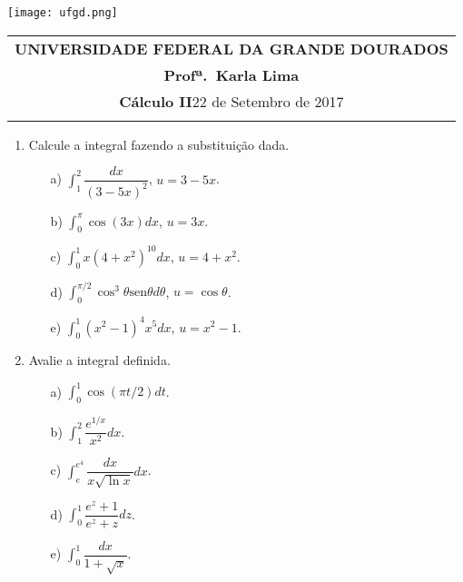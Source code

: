 \documentclass[a4paper,5pt]{amsbook}
\newcommand{\sen}{\text{sen}}
\begin{document}
\thispagestyle{empty}
\hspace{-0.6cm}
\begin{minipage}[p]{0.14\linewidth}
	\texttt{[image: ufgd.png]}
\end{minipage}
\begin{minipage}[p]{0.7\linewidth}
\begin{tabular}{c}
\toprule{}
{{\bf UNIVERSIDADE FEDERAL DA GRANDE DOURADOS}}\\
{{\bf Profª.\ Karla Lima}}\\
\midrule{}
{{\bf Cálculo II}}\hspace{4cm}22 de Setembro de 2017 \\



\bottomrule{}
\end{tabular}
\vspace{-0.45cm}
\end{minipage}
\vspace{1 cm}
\begin{enumerate}
\item Calcule a integral fazendo a substituição dada.
\begin{itemize}
 \item[a)]$\displaystyle\int_{1}^{2}\dfrac{dx}{(3-5x)^2}$, $u=3-5x$.\\
 \item[b)]$\displaystyle\int_{0}^{\pi}\cos(3x)dx$, $u=3x$.\\
 \item[c)]$\displaystyle\int_{0}^{1}x(4+x^2)^{10}dx$, $u=4+x^2$.\\
 \item[d)]$\displaystyle\int_{0}^{\pi/2}\cos^3\theta \sen\theta d\theta$, $u=\cos\theta$.\\
 \item[e)]$\displaystyle\int_{0}^{1}(x^2-1)^4x^5 dx$, $u=x^2-1$.\\
\end{itemize}
\item Avalie a integral definida.
\begin{itemize}
 \item[a)]$\displaystyle\int_{0}^{1}\cos(\pi t/2)dt$.\\
 \item[b)]$\displaystyle\int_{1}^{2}\dfrac{e^{1/x}}{x^2}dx$.\\
 \item[c)]$\displaystyle\int_{e}^{e^4}\dfrac{dx}{x\sqrt{\ln x}}dx$.\\
 \item[d)]$\displaystyle\int_{0}^{1}\dfrac{e^z+1}{e^z+z}dz$.\\
 \item[e)]$\displaystyle\int_{0}^{1}\dfrac{dx}{1+\sqrt{x}}$.\\
\end{itemize}


\end{enumerate}
\end{document}

